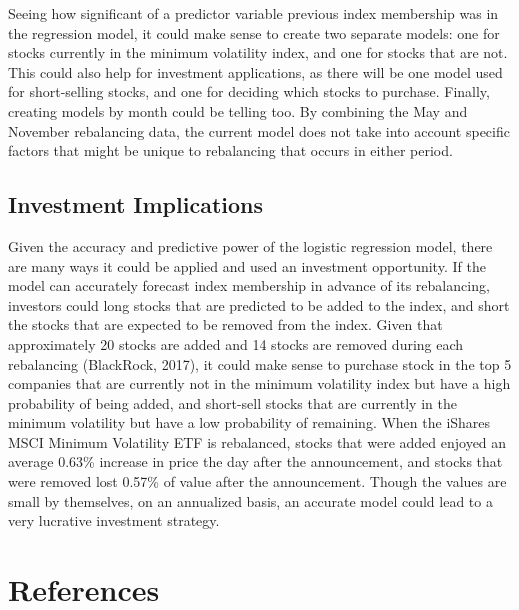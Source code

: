 \documentclass[12pt,twoside]{reedthesis}
\theoremstyle{definition}
\theoremstyle{definition}
\theoremstyle{definition}
\theoremstyle{remark}
\begin{document}
Seeing how significant of a predictor variable previous index membership
was in the regression model, it could make sense to create two separate
models: one for stocks currently in the minimum volatility index, and
one for stocks that are not. This could also help for investment
applications, as there will be one model used for short-selling stocks,
and one for deciding which stocks to purchase. Finally, creating models
by month could be telling too. By combining the May and November
rebalancing data, the current model does not take into account specific
factors that might be unique to rebalancing that occurs in either
period.

\section{Investment Implications}\label{investment-implications}

Given the accuracy and predictive power of the logistic regression
model, there are many ways it could be applied and used an investment
opportunity. If the model can accurately forecast index membership in
advance of its rebalancing, investors could long stocks that are
predicted to be added to the index, and short the stocks that are
expected to be removed from the index. Given that approximately 20
stocks are added and 14 stocks are removed during each rebalancing
(BlackRock, 2017), it could make sense to purchase stock in the top 5
companies that are currently not in the minimum volatility index but
have a high probability of being added, and short-sell stocks that are
currently in the minimum volatility but have a low probability of
remaining. When the iShares MSCI Minimum Volatility ETF is rebalanced,
stocks that were added enjoyed an average 0.63\% increase in price the
day after the announcement, and stocks that were removed lost 0.57\% of
value after the announcement. Though the values are small by themselves,
on an annualized basis, an accurate model could lead to a very lucrative
investment strategy.

\backmatter

\chapter*{References}\label{references}


\noindent

\setlength{\parindent}{-0.20in} \setlength{\leftskip}{0.20in}
\setlength{\parskip}{8pt}
\end{document}

